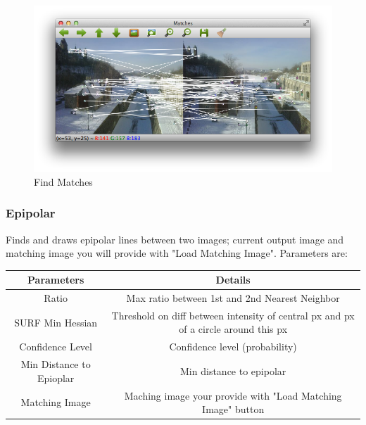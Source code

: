 \documentclass{article}
\begin{document}
\begin{figure}[H]
\begin{center}
\includegraphics[scale=0.5]{toolboxFindMatches.png}
\caption{Find Matches}
\end{center}
\end{figure}	   

\subsubsection{Epipolar}
Finds and draws epipolar lines between two images; current output image and matching image you will provide with "Load Matching Image". Parameters are:

\begin{table}[H]
\begin{center}
\begin{tabular}{|c|c|l|l|l|}
\hline
\textbf{Parameters}      & \multicolumn{4}{|c|}{\textbf{Details}}                                                                    \\ \hline
Ratio                    & \multicolumn{4}{|c|}{Max ratio between 1st and 2nd Nearest Neighbor}                                      \\ \hline
SURF Min Hessian         & \multicolumn{4}{|c|}{Threshold on diff between intensity of central px and px of a circle around this px} \\ \hline
Confidence Level         & \multicolumn{4}{|c|}{Confidence level (probability)}                                                      \\ \hline
Min Distance to Epioplar & \multicolumn{4}{|c|}{Min distance to epipolar}                                                            \\ \hline
Matching Image           & \multicolumn{4}{|c|}{Maching image your provide with "Load Matching Image" button}                        \\ \hline
\end{tabular}
\end{center}
\end{table}
\end{document}
